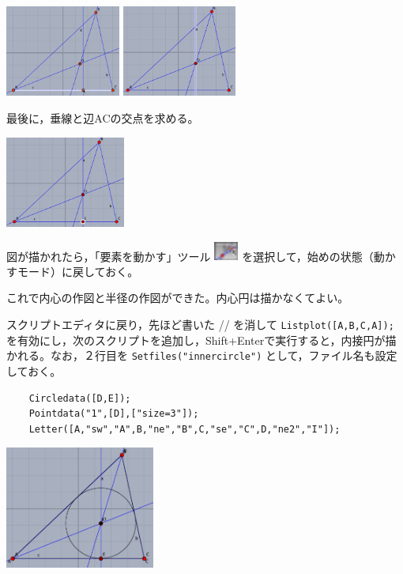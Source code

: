 \documentclass[papersize,a4paper,12pt,uplatex]{jsarticle}
\begin{document}
\hspace{20mm}\includegraphics[bb=0.00 0.00 403.02 319.02,height=3cm]{Fig/start06.pdf} \hspace{5mm}\includegraphics[bb=0.00 0.00 394.02 315.02,height=3cm]{Fig/start07.pdf} 

最後に，垂線と辺ACの交点を求める。

\begin{center}\includegraphics[bb=0.00 0.00 409.02 312.02,height=3cm]{Fig/start08.pdf}\end{center}

図が描かれたら，「要素を動かす」ツール \includegraphics[bb=0.00 0.00 6.48 5.04,width=8mm]{Fig/move.pdf} を選択して，始めの状態（動かすモード）に戻しておく。

これで内心の作図と半径の作図ができた。内心円は描かなくてよい。

スクリプトエディタに戻り，先ほど書いた // を消して \verb|Listplot([A,B,C,A]);|  を有効にし，次のスクリプトを追加し，Shift+Enterで実行すると，内接円が描かれる。なお，２行目を \verb|Setfiles("innercircle")| として，ファイル名も設定しておく。

\begin{verbatim}
    Circledata([D,E]);
    Pointdata("1",[D],["size=3"]);
    Letter([A,"sw","A",B,"ne","B",C,"se","C",D,"ne2","I"]);
\end{verbatim}

\begin{center}\includegraphics[bb=0.00 0.00 396.02 322.02,height=4cm]{Fig/start09.pdf} \end{center}
\end{document}
